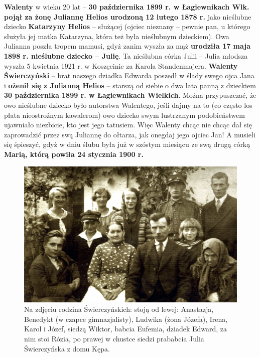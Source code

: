 \textbf{Walenty} w wieku 20 lat – \textbf{30 października 1899 r. w Łagiewnikach Wlk. pojął za żonę Juliannę Helios urodzoną 12 lutego 1878 r.} jako nieślubne dziecko \textbf{Katarzyny Helios} – służącej (ojciec nieznany – pewnie pan, u którego służyła jej matka Katarzyna, która też była nieślubnym dzieckiem). Owa Julianna poszła tropem mamusi, gdyż zanim wyszła za mąż \textbf{urodziła 17 maja 1898 r. nieślubne dziecko – Julię}. Ta nieślubna córka Julii – Julia młodsza wyszła 5 kwietnia 1921 r. w Koszęcinie za Karola Standenmajera. \textbf{Walenty Świerczyński} – brat naszego dziadka Edwarda poszedł w ślady swego ojca Jana i \textbf{ożenił się z Julianną Helios} – starszą od siebie o dwa lata panną z dzieckiem \textbf{30 października 1899 r. w Łagiewnikach Wielkich}. Można przypuszczać, że owo nieślubne dziecko było autorstwa Walentego, jeśli dajmy na to (co często los płata nieostrożnym kawalerom) owo dziecko swym lustrzanym podobieństwem ujawniało niezbicie, kto jest jego tatusiem. Więc Walenty chcąc nie chcąc dał się zaprowadzić przez swą Juliannę do ołtarza, jak onegdaj jego ojciec Jan! A musieli się śpieszyć, gdyż w dniu ślubu była już w szóstym miesiącu ze swą drugą córką \textbf{Marią, którą powiła 24 stycznia 1900 r.}

\begin{figure}[!h]
\begin{center}
\includegraphics[width=\textwidth]{photo/rodzina_swierczynskich_1.jpg}
\caption[Rodzina Świerczyńskich z prababcią Julią]{Na zdjęciu rodzina Świerczyńskich: stoją od lewej: Anastazja, Benedykt (w czapce gimnazjalisty), Ludwika (żona Józefa), Irena, Karol i Józef, siedzą Wiktor, babcia Eufemia, dziadek Edward, za nim stoi Rózia, po prawej w chustce siedzi prababcia Julia Świerczyńska z domu Kępa.}
\end{center}
\end{figure}

